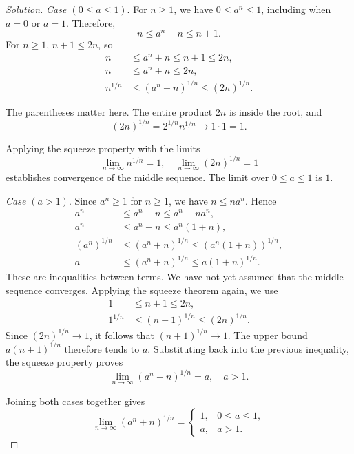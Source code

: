 \begin{proof}[Solution]
  \textit{Case $(0\le a\le1)$}.
  For $n\ge1$, we have $0\le a^n\le1$, including
  when $a=0$ or $a=1$. Therefore,
  \[
    n\le a^n+n\le n+1.
  \]
  For $n\ge1$, $n+1\le2n$, so
  \begin{align*}
    n&\le a^n+n\le n+1\le2n,\\
    n&\le a^n+n\le2n,\\
    n^{1/n}&\le(a^n+n)^{1/n}\le(2n)^{1/n}.
  \end{align*}

  The parentheses matter here. The entire product $2n$ is inside the
  root, and
  \[
    (2n)^{1/n}=2^{1/n}n^{1/n}\longrightarrow1\cdot1=1.
  \]

  Applying the squeeze property with the limits
  \[
    \lim_{n\to\infty}n^{1/n}=1,\quad
    \lim_{n\to\infty}(2n)^{1/n}=1
  \]
  establishes convergence of the middle sequence.
  The limit over $0\le a\le1$ is $1$.

  \textit{Case $(a>1)$}.
  Since $a^n\ge1$ for $n\ge1$, we have $n\le na^n$. Hence
  \begin{align*}
    a^n&\le a^n+n\le a^n+na^n,\\
    a^n&\le a^n+n\le a^n(1+n),\\
    (a^n)^{1/n}&\le(a^n+n)^{1/n}\le(a^n(1+n))^{1/n},\\
    a&\le(a^n+n)^{1/n}
      \le a(1+n)^{1/n}.
  \end{align*}
  These are inequalities between terms. We have not
  yet assumed that the middle sequence converges.
  Applying the squeeze theorem again, we use
  \begin{align*}
    1&\le n+1\le2n,\\
    1^{1/n}&\le(n+1)^{1/n}\le(2n)^{1/n}.
  \end{align*}
  Since $(2n)^{1/n}\to1$, it follows that
  $(n+1)^{1/n}\to1$. The upper bound $a(n+1)^{1/n}$ therefore tends to $a$.
  Substituting back into the previous inequality,
  the squeeze property proves
  \[
    \lim_{n\to\infty}(a^n+n)^{1/n}=a,\quad a>1.
  \]

  Joining both cases together gives
  \[
    \lim_{n\to\infty}(a^n+n)^{1/n}
      =\begin{cases}
        1,&0\le a\le1,\\
        a,&a>1.
      \end{cases}
  \]
\end{proof}
